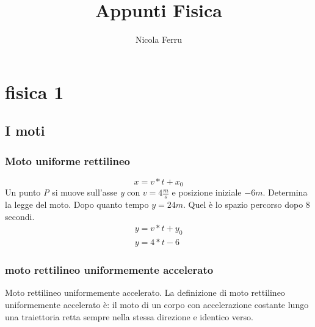 \documentclass{book}
\title{Appunti Fisica}
\author{Nicola Ferru}
\date{}
\begin{document}
\maketitle
\tableofcontents
\listoftables
\listoffigures


\part{fisica 1}

\chapter{I moti}
\section{Moto uniforme rettilineo}
\begin{equation}
	x=v*t+x_0
\end{equation}
Un punto \textit{P} si muove sull'asse \textit{y} con $v=4\frac{m}{s}$ e
posizione iniziale $-6m$. Determina la legge del moto. Dopo quanto tempo
$y=24m$. Quel è lo spazio percorso dopo 8 secondi.
\begin{equation}
	\begin{matrix}
		y=v*t+y_0\\
		\boxed{y=4*t-6}
	\end{matrix}
\end{equation}

\section{moto rettilineo uniformemente accelerato}
Moto rettilineo uniformemente accelerato. La definizione di moto rettilineo uniformemente accelerato è: il moto di un corpo con accelerazione costante lungo una traiettoria retta sempre nella stessa direzione e identico verso.
\end{document}
